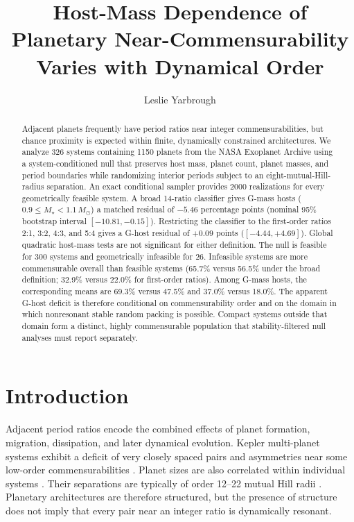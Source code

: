 \documentclass[twocolumn,linenumbers]{aastex631}
\begin{document}
\title{Host-Mass Dependence of Planetary Near-Commensurability Varies with Dynamical Order}

\author{Leslie Yarbrough}

\begin{abstract}
Adjacent planets frequently have period ratios near integer
commensurabilities, but chance proximity is expected within finite,
dynamically constrained architectures. We analyze 326 systems containing 1150
planets from the NASA Exoplanet Archive using a system-conditioned null that
preserves host mass, planet count, planet masses, and period boundaries while
randomizing interior periods subject to an eight-mutual-Hill-radius separation.
An exact conditional sampler provides 2000 realizations for every geometrically
feasible system. A broad 14-ratio classifier gives G-mass hosts
($0.9\leq M_\star<1.1\,M_\odot$) a matched residual of $-5.46$ percentage
points (nominal 95\% bootstrap interval $[-10.81,-0.15]$). Restricting the
classifier to the first-order ratios 2:1, 3:2, 4:3, and 5:4 gives a G-host
residual of $+0.09$ points ($[-4.44,+4.69]$). Global quadratic host-mass tests
are not significant for either definition. The null is feasible for 300
systems and geometrically infeasible for 26. Infeasible systems are more
commensurable overall than feasible systems (65.7\% versus 56.5\% under the
broad definition; 32.9\% versus 22.0\% for first-order ratios). Among G-mass
hosts, the corresponding means are 69.3\% versus 47.5\% and 37.0\% versus
18.0\%. The apparent G-host deficit is therefore conditional on
commensurability order and on the domain in which nonresonant stable random
packing is possible. Compact systems outside that domain form a distinct,
highly commensurable population that stability-filtered null analyses must
report separately.
\end{abstract}


\section{Introduction}

Adjacent period ratios encode the combined effects of planet formation,
migration, dissipation, and later dynamical evolution. Kepler multi-planet
systems exhibit a deficit of very closely spaced pairs and asymmetries near
some low-order commensurabilities \citep{fabrycky2014,weiss2018}. Planet sizes
are also correlated within individual systems
\citep{weiss2018,millholland2021}. Their separations are typically of order
12--22 mutual Hill radii \citep{fang_margot_2013,puwu2015}. Planetary
architectures are therefore structured, but the presence of structure does
not imply that every pair near an integer ratio is dynamically resonant.
\end{document}

